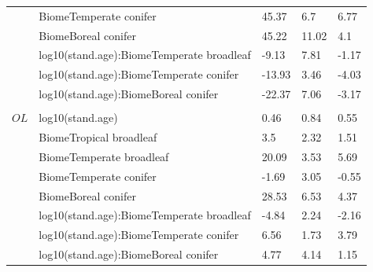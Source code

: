 \documentclass[
]{article}
\begin{document}
\begin{longtable}{lllll}
\hspace{1em} & BiomeTemperate conifer & 45.37 & 6.7 & 6.77\\
\hspace{1em} & BiomeBoreal conifer & 45.22 & 11.02 & 4.1\\
\hspace{1em} & log10(stand.age):BiomeTemperate broadleaf & -9.13 & 7.81 & -1.17\\
\hspace{1em} & log10(stand.age):BiomeTemperate conifer & -13.93 & 3.46 & -4.03\\
\hspace{1em} & log10(stand.age):BiomeBoreal conifer & -22.37 & 7.06 & -3.17\\
\addlinespace[1em]
\multicolumn{4}{l}{\textbf{}}\\
\hspace{1em}$OL$ & log10(stand.age) & 0.46 & 0.84 & 0.55\\
\hspace{1em} & BiomeTropical broadleaf & 3.5 & 2.32 & 1.51\\
\hspace{1em} & BiomeTemperate broadleaf & 20.09 & 3.53 & 5.69\\
\hspace{1em} & BiomeTemperate conifer & -1.69 & 3.05 & -0.55\\
\hspace{1em} & BiomeBoreal conifer & 28.53 & 6.53 & 4.37\\
\hspace{1em} & log10(stand.age):BiomeTemperate broadleaf & -4.84 & 2.24 & -2.16\\
\hspace{1em} & log10(stand.age):BiomeTemperate conifer & 6.56 & 1.73 & 3.79\\
\hspace{1em} & log10(stand.age):BiomeBoreal conifer & 4.77 & 4.14 & 1.15\\*
\end{longtable}
\endgroup{}
\end{document}

